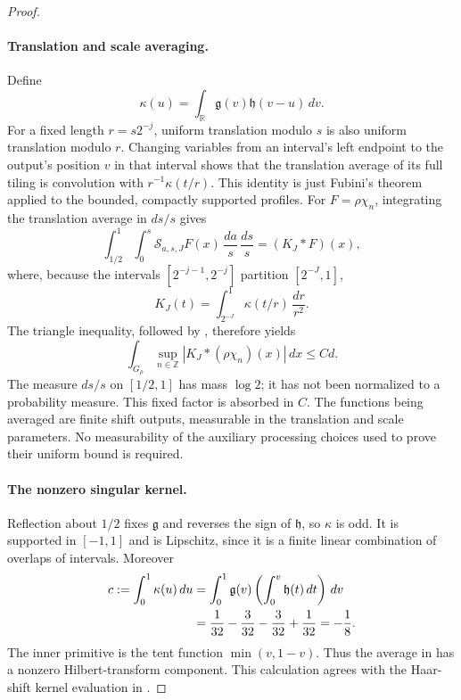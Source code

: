 \begin{proof}
\paragraph{Translation and scale averaging.}
Define
\[
 \kappa(u)=\int_{\mathbb R}\mathfrak g(v)\mathfrak h(v-u)\,dv.
\]
For a fixed length $r=s2^{-j}$, uniform translation modulo $s$ is also
uniform translation modulo $r$. Changing variables from an interval's
left endpoint to the output's position $v$ in that interval shows that
the translation average of its full tiling is convolution with
$r^{-1}\kappa(t/r)$. This identity is just Fubini's theorem applied to
the bounded, compactly supported profiles.
For $F=\rho\chi_n$, integrating the translation average in $ds/s$ gives
\[
 \int_{1/2}^1\int_0^s\mathcal S_{a,s,J}F(x)
                 \,\frac{da}{s}\,\frac{ds}{s}=(K_J*F)(x),
\]
where, because the intervals $[2^{-j-1},2^{-j}]$ partition $[2^{-J},1]$,
\begin{equation}\label{eq:fourier-averaged-kernel}
 K_J(t)=\int_{2^{-J}}^1\kappa(t/r)\,\frac{dr}{r^2}.
\end{equation}
The triangle inequality, followed by ,
therefore yields
\begin{equation}\label{eq:fourier-kernel-bound}
 \int_{G_\rho}\sup_{n\in\mathbb Z}
                  |K_J*(\rho\chi_n)(x)|\,dx\le Cd.
\end{equation}
The measure $ds/s$ on $[1/2,1]$ has mass $\log2$; it has not been
normalized to a probability measure. This fixed factor is absorbed in
$C$. The functions being averaged are finite shift outputs, measurable
in the translation and scale parameters. No measurability of the
auxiliary processing choices used to prove their uniform bound is
required.

\paragraph{The nonzero singular kernel.}
Reflection about $1/2$ fixes $\mathfrak g$ and reverses the sign of
$\mathfrak h$, so $\kappa$ is odd. It is supported in $[-1,1]$ and is
Lipschitz, since it is a finite linear combination of overlaps of
intervals. Moreover
\begin{align}
 c:=\int_0^1\kappa(u)\,du
 &=\int_0^1\mathfrak g(v)
                    \left(\int_0^v\mathfrak h(t)\,dt\right)\,dv
 \notag\\
 &=\frac1{32}-\frac3{32}-\frac3{32}+\frac1{32}
 =-\frac18.                                      \label{eq:fourier-c}
\end{align}
The inner primitive is the tent function $\min(v,1-v)$.
Thus the average in  has a nonzero
Hilbert-transform component. This calculation agrees with the Haar-shift kernel evaluation in
\cite[Section~3, pp.~1135--1136]{Hytonen2008}.


\end{proof}
